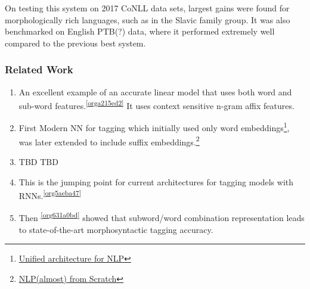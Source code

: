 \documentclass[11pt]{article}
\begin{document}
On testing this system on 2017 CoNLL data sets, largest gains were found for morphologically rich languages, such as in the Slavic family group. It was also benchmarked on English PTB(?) data, where it performed extremely well compared to the previous best system.
\subsubsection{Related Work}
\label{sec:orgdf38cc3}
\begin{enumerate}
\item An excellent example of an accurate linear model that uses both word and sub-word features.\textsuperscript{\ref{orga215ed2}} It uses context sensitive n-gram affix features.
\item First Modern NN for tagging which initially used only word embeddings\footnote{\href{http://machinelearning.org/archive/icml2008/papers/391.pdf}{Unified architecture for NLP}}, was later extended to include suffix embeddings.\footnote{\href{https://www.jmlr.org/papers/volume12/collobert11a/collobert11a.pdf}{NLP(almost) from Scratch}}
\item TBD TBD
\item This is the jumping point for current architectures for tagging models with RNNs.\textsuperscript{\ref{org5aeba47}}
\item Then \textsuperscript{\ref{org631a0bd}} showed that subword/word combination representation leads to state-of-the-art morphosyntactic tagging accuracy.
\end{enumerate}
\end{document}
